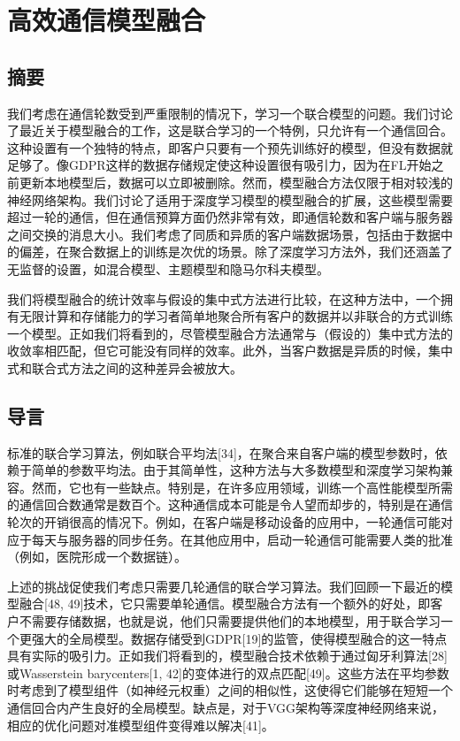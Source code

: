 \chapter{高效通信模型融合}

\section*{摘要}
我们考虑在通信轮数受到严重限制的情况下，学习一个联合模型的问题。我们讨论了最近关于模型融合的工作，这是联合学习的一个特例，只允许有一个通信回合。这种设置有一个独特的特点，即客户只要有一个预先训练好的模型，但没有数据就足够了。像GDPR这样的数据存储规定使这种设置很有吸引力，因为在FL开始之前更新本地模型后，数据可以立即被删除。然而，模型融合方法仅限于相对较浅的神经网络架构。我们讨论了适用于深度学习模型的模型融合的扩展，这些模型需要超过一轮的通信，但在通信预算方面仍然非常有效，即通信轮数和客户端与服务器之间交换的消息大小。我们考虑了同质和异质的客户端数据场景，包括由于数据中的偏差，在聚合数据上的训练是次优的场景。除了深度学习方法外，我们还涵盖了无监督的设置，如混合模型、主题模型和隐马尔科夫模型。

我们将模型融合的统计效率与假设的集中式方法进行比较，在这种方法中，一个拥有无限计算和存储能力的学习者简单地聚合所有客户的数据并以非联合的方式训练一个模型。正如我们将看到的，尽管模型融合方法通常与（假设的）集中式方法的收敛率相匹配，但它可能没有同样的效率。此外，当客户数据是异质的时候，集中式和联合式方法之间的这种差异会被放大。

\section{导言}
标准的联合学习算法，例如联合平均法[34]，在聚合来自客户端的模型参数时，依赖于简单的参数平均法。由于其简单性，这种方法与大多数模型和深度学习架构兼容。然而，它也有一些缺点。特别是，在许多应用领域，训练一个高性能模型所需的通信回合数通常是数百个。这种通信成本可能是令人望而却步的，特别是在通信轮次的开销很高的情况下。例如，在客户端是移动设备的应用中，一轮通信可能对应于每天与服务器的同步任务。在其他应用中，启动一轮通信可能需要人类的批准（例如，医院形成一个数据链）。

上述的挑战促使我们考虑只需要几轮通信的联合学习算法。我们回顾一下最近的模型融合[48, 49]技术，它只需要单轮通信。模型融合方法有一个额外的好处，即客户不需要存储数据，也就是说，他们只需要提供他们的本地模型，用于联合学习一个更强大的全局模型。数据存储受到GDPR[19]的监管，使得模型融合的这一特点具有实际的吸引力。正如我们将看到的，模型融合技术依赖于通过匈牙利算法[28]或Wasserstein barycenters[1, 42]的变体进行的双点匹配[49]。这些方法在平均参数时考虑到了模型组件（如神经元权重）之间的相似性，这使得它们能够在短短一个通信回合内产生良好的全局模型。缺点是，对于VGG架构等深度神经网络来说，相应的优化问题对准模型组件变得难以解决[41]。

